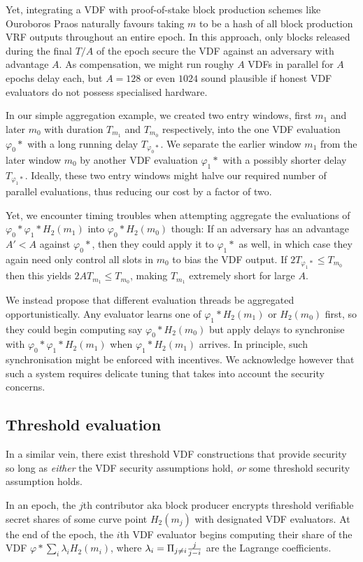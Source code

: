 \documentclass{article}
\begin{document}
Yet, integrating a VDF with proof-of-stake block production schemes
like Ouroboros Praos naturally favours taking $m$ to be a hash of
all block production VRF outputs throughout an entire epoch. 
In this approach, only blocks released during the final $T/A$ of the
epoch secure the VDF against an adversary with advantage $A$.
As compensation, we might run roughy $A$ VDFs in parallel for $A$
epochs delay each, but $A = 128$ or even $1024$ sound plausible if
honest VDF evaluators do not possess specialised hardware.

In our simple aggregation example, we created two entry windows,
first $m_1$ and later $m_0$ with duration $T_{m_1}$ and $T_{m_0}$
respectively, into the one VDF evaluation $φ_0*$ with a long running
delay $T_{φ_0*}$.  We separate the earlier window $m_1$ from the later
window $m_0$ by another VDF evaluation $φ_1*$ with a possibly shorter
delay $T_{φ_1*}$.  Ideally, these two entry windows might halve our
required number of parallel evaluations, thus reducing our cost by a
factor of two. 

Yet, we encounter timing troubles when attempting aggregate the
evaluations of $φ_0* φ_1* H_2(m_1)$ into $φ_0* H_2(m_0)$ though:  
If an adversary has an advantage $A' < A$ against $φ_0*$, then they
could apply it to $φ_1*$ as well, in which case they again need only
control all slots in $m_0$ to bias the VDF output.  
If $2 T_{φ_1*} \leq T_{m_0}$ then this yields $2 A T_{m_1} \leq T_{m_0}$,
making $T_{m_1}$ extremely short for large $A$.  

We instead propose that different evaluation threads be aggregated
opportunistically.  Any evaluator learns one of $φ_1* H_2(m_1)$ or
$H_2(m_0)$ first, so they could begin computing say $φ_0* H_2(m_0)$
but apply delays to synchronise with $φ_0* φ_1* H_2(m_1)$ when 
$φ_1* H_2(m_1)$ arrives.  In principle, such synchronisation might
be enforced with incentives.  We acknowledge however that such a
system requires delicate tuning that takes into account the
security concerns.  

\subsection{Threshold evaluation}

In a similar vein, there exist threshold VDF constructions that
provide security so long as {\it either} the VDF security assumptions
hold, {\it or} some threshold security assumption holds. 

In an epoch, the $j$th contributor aka block producer encrypts
threshold verifiable secret shares \cite{Schoenmakers99asimple} %
of some curve point $H_2(m_j)$ with designated VDF evaluators.
At the end of the epoch, the $i$th VDF evaluator begins computing
their share of the VDF  $φ* \sum_i \lambda_i H_2(m_i)$, where
$\lambda_i = \Pi_{j \neq i} {j \over j-i}$ are the Lagrange coefficients.
\end{document}
